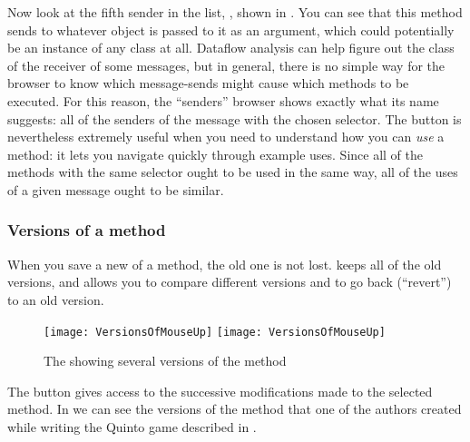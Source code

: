 \documentclass[a4paper,10pt,twoside]{book}
\begin{document}
Now look at the fifth sender in the list, , shown in .
You can see that this method sends  to whatever object is passed to it as an argument, which could potentially be an instance of any class at all.  
Dataflow analysis can help figure out the class of the receiver of some messages, but in general, there is no simple way for the browser to know which message-sends might cause which methods to be executed.
For this reason,  the ``senders'' browser shows exactly what its name suggests: all of the senders of the message with the chosen selector.  
The  button is nevertheless extremely useful when you need to understand how you can \emph{use} a method: it lets you navigate quickly through example uses.  
Since all of the methods with the same selector ought to be used in the same way, all of the uses of a given message ought to be similar.

\subsubsection{Versions of a method}
\label{sec:versions}

When you save a new  of a method, the old one is not lost.  \sq keeps all of the old versions, and allows you to compare different versions and to go back (``revert'') to an old version.

\begin{figure}[btp]
   \centering
   \ifluluelse
	   {\texttt{[image: VersionsOfMouseUp]} }
	   {\texttt{[image: VersionsOfMouseUp]} }
   \caption{The  showing several versions of the  method}
   \label{fig:mouseUpVersions}
\end{figure}
The  button gives access to the successive modifications made to the selected method.
In  we can see the versions of the  method that one of the authors created while writing the Quinto game described in .
\end{document}
